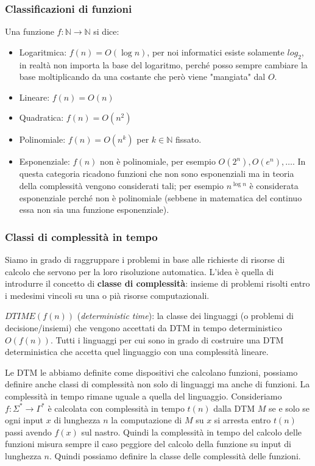 \documentclass{article}
\begin{document}
\subsubsection{Classificazioni di funzioni}
Una funzione $f:\mathbb{N}\rightarrow\mathbb{N}$ si dice:
\begin{itemize}
    \item Logaritmica: $f(n)=O(\log n)$, per noi informatici esiste solamente $log_2$,
    in realtà non importa la base del logaritmo, perché posso sempre cambiare la base
    moltiplicando da una costante che però viene "mangiata" dal $O$.
    \item Lineare: $f(n)=O(n)$
    \item Quadratica: $f(n)=O(n^2)$
    \item Polinomiale: $f(n)=O(n^k)$ per $k\in\mathbb{N}$ fissato.
    \item Esponenziale: $f(n)$ non è polinomiale, per esempio $O(2^n),O(e^n),\dots$. In questa
    categoria ricadono funzioni che non sono esponenziali ma in teoria della complessità
    vengono considerati tali; per esempio $n^{\log n}$ è considerata esponenziale
    perché non è polinomiale (sebbene in matematica del continuo essa non sia una funzione
    esponenziale).
\end{itemize}

\subsubsection{Classi di complessità in tempo}
Siamo in grado di raggruppare i problemi in base alle richieste di risorse di calcolo
che servono per la loro risoluzione automatica. L'idea è quella di introdurre il concetto
di \textbf{classe di complessità}: insieme di problemi risolti entro i medesimi vincoli
su una o pià risorse computazionali.\mbox{}\newline

$DTIME(f(n))$ (\textit{deterministic time}): la classe dei linguaggi
(o problemi di decisione/insiemi) che vengono
accettati da DTM in tempo deterministico $O(f(n))$. Tutti i linguaggi per cui sono in grado
di costruire una DTM deterministica che accetta quel linguaggio con una complessità lineare.

Le DTM le abbiamo definite come dispositivi che calcolano funzioni, possiamo definire
anche classi di complessità non solo di linguaggi ma anche di funzioni. La complessità
in tempo rimane uguale a quella del linguaggio. Consideriamo $f:\Sigma^*\rightarrow\Gamma^*$
è calcolata con complessità in tempo $t(n)$ dalla DTM $M$ se e solo se ogni input $x$
di lunghezza $n$ la computazione di $M$ su $x$ si arresta entro $t(n)$ passi avendo $f(x)$
sul nastro. Quindi la complessità in tempo del calcolo delle funzioni misura sempre il caso peggiore
del calcolo della funzione su input di lunghezza $n$. Quindi possiamo definire
la classe delle complessità delle funzioni.\mbox{}\newline
\end{document}
